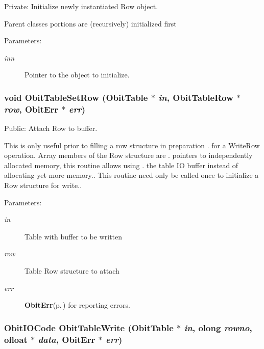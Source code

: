 Private: Initialize newly instantiated Row object. 

Parent classes portions are (recursively) initialized first \begin{Desc}
\item[Parameters:]
\begin{description}
\item[{\em inn}]Pointer to the object to initialize. \end{description}
\end{Desc}
\subsubsection{\setlength{\rightskip}{0pt plus 5cm}void Obit\-Table\-Set\-Row ({\bf Obit\-Table} $\ast$ {\em in}, {\bf Obit\-Table\-Row} $\ast$ {\em row}, {\bf Obit\-Err} $\ast$ {\em err})}\label{ObitTable_8c_a31}


Public: Attach Row to buffer. 

This is only useful prior to filling a row structure in preparation . for a Write\-Row operation. Array members of the Row structure are . pointers to independently allocated memory, this routine allows using . the table IO buffer instead of allocating yet more memory.. This routine need only be called once to initialize a Row structure for write.. \begin{Desc}
\item[Parameters:]
\begin{description}
\item[{\em in}]Table with buffer to be written \item[{\em row}]Table Row structure to attach \item[{\em err}]{\bf Obit\-Err}{\rm (p.\,\pageref{structObitErr})} for reporting errors. \end{description}
\end{Desc}
\subsubsection{\setlength{\rightskip}{0pt plus 5cm}Obit\-IOCode Obit\-Table\-Write ({\bf Obit\-Table} $\ast$ {\em in}, {\bf olong} {\em rowno}, {\bf ofloat} $\ast$ {\em data}, {\bf Obit\-Err} $\ast$ {\em err})}\label{ObitTable_8c_a28}


